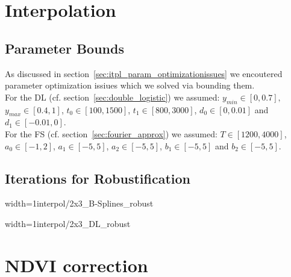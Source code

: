 \section{Interpolation}
	\subsection{Parameter Bounds} \label{sec:app-param_bounds}
		As discussed in section~\ref{sec:itpl_param_optimizationissues} we encoutered parameter optimization issiues which we solved via bounding them. \\
		For the DL (cf. section~\ref{sec:double_logistic}) we assumed:  
		$y_{min} \in [0,0.7],$ 
		$y_{max} \in [0.4,1]$,
		$t_0 \in [100,1500]$,
		$t_1 \in [800,3000]$,
		$d_0 \in [0,0.01]$ and
		$d_1 \in [-0.01,0]$. 
		\\
		For the FS (cf. section~\ref{sec:fourier_approx}) we assumed: 
		$T \in [1200,4000]$,
		$a_0   \in [-1,2]$,
		$a_1   \in [-5,5]$,
		$a_2   \in [-5,5]$,
		$b_1   \in [-5,5]$ and
		$b_2   \in [-5,5]$.
	\subsection{Iterations for Robustification} 
\begin{my_figure}[H]{width=1\textwidth}{interpol/2x3_B-Splines_robust}
	\caption[B-splines robustification.]{B-splines \RobItPlot}
	\label{fig:interpol/2x3_B-Splines_robust}
\end{my_figure}

\begin{my_figure}[H]{width=1\textwidth}{interpol/2x3_DL_robust}
	\caption[A Double Logistic curve robustification.]{A Double Logistic curve \RobItPlot}
	\label{fig:interpol/2x3_DL_robust}
\end{my_figure}



\section{NDVI correction}



